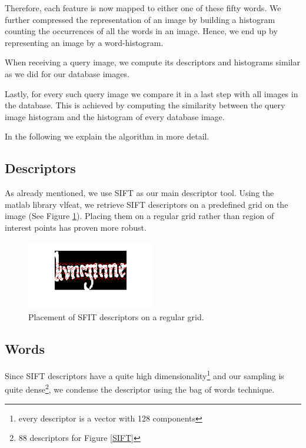 \documentclass[conference]{IEEEtran}
\begin{document}
Therefore, each feature is now mapped to either one of these fifty words. We further compressed the representation of an image by building a histogram counting the occurrences of all the words in an image. Hence, we end up by representing an image by a word-histogram.

When receiving a query image, we compute its descriptors and histograms similar as we did for our database images. 

Lastly, for every such query image we compare 
it in a last step with all images in the database. This is achieved by computing the similarity between the query image histogram and the histogram of every database image.

In the following we explain the algorithm in more detail.

\subsection{Descriptors}
\label{sub:descriptors}
As already mentioned, we use SIFT as our main descriptor tool. 
Using the matlab library vlfeat\cite{vedaldi08vlfeat}, 
we retrieve SIFT descriptors on a predefined grid on the image (See Figure \ref{fig:SIFT}). 
Placing them on a regular grid rather than region of interest points
has proven more robust.

\begin{figure}[!t]
\centering
\includegraphics[width=0.5\textwidth]{descriptor_placement}
\caption{Placement of SFIT descriptors on a regular grid.}
\label{fig:SIFT}
\end{figure}

\subsection{Words}
\label{sub:words}
Since SIFT descriptors have a quite high dimensionality\footnote{ every descriptor is a vector with 128 components}
and our sampling is quite dense\footnote{88 descriptors for Figure \ref{SIFT}}, we condense the
descriptor using the bag of words technique. 
\end{document}
